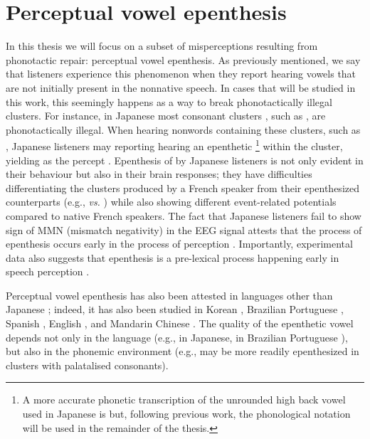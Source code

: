 \section{Perceptual vowel epenthesis}
In this thesis we will focus on a subset of misperceptions resulting from phonotactic repair: perceptual vowel epenthesis. As previously mentioned, we say that listeners experience this phenomenon when they report hearing vowels that are not initially present in the nonnative speech. In cases that will be studied in this work, this seemingly happens as a way to break phonotactically illegal clusters. For instance, in Japanese most consonant clusters%
, such as , are phonotactically illegal. When hearing nonwords containing these clusters, such as , Japanese listeners may reporting hearing an epenthetic \footnote{A more accurate phonetic transcription of the unrounded high back vowel used in Japanese is \textipa{[W]} but, following previous work, the phonological notation  will be used in the remainder of the thesis.} within the cluster, yielding  as the percept \cite{dupoux1999}. Epenthesis of  by Japanese listeners is not only evident in their behaviour but also in their brain responses; they have difficulties differentiating the clusters produced by a French speaker from their epenthesized counterparts (e.g.,  \textit{vs.} ) while also showing different event-related potentials compared to native French speakers. The fact that Japanese listeners fail to show sign of MMN (mismatch negativity) in the EEG signal attests that the process of epenthesis occurs early in the process of perception \cite{dehaene2000}. Importantly, experimental data also suggests that epenthesis is a pre-lexical process happening early in speech perception \cite{dupoux2001}.

Perceptual vowel epenthesis has also been attested in languages other than Japanese \cite{dupoux1999, dehaene2000, dupoux2001, monahan2009, dupoux2011, mattingley2015}; indeed, it has also been studied in Korean \cite{kabak2007, shin2011, dejong2012, durvasula2015, durvasula2016}, Brazilian Portuguese \cite{dupoux2011}, Spanish \cite{halle2014}, English \cite{berent2007, zhao2018}, and Mandarin Chinese \cite{durvasula2018}. The quality of the epenthetic vowel depends not only in the language (e.g., \textipa{[W]} in Japanese, \textipa{[i]} in Brazilian Portuguese \cite{dupoux2011}), but also in the phonemic environment (e.g.,  may be more readily epenthesized in clusters with palatalised consonants). 


